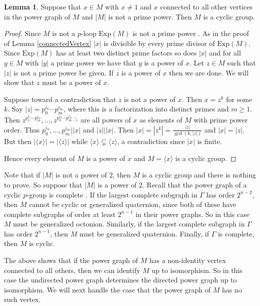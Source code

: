 \documentclass[12pt]{report}
\theoremstyle{definition}
\newtheorem{lem}[thm]{Lemma}
\newcommand{\Exp}{\text{Exp}}       %
\begin{document}
\begin{lem}
  Suppose that $x\in M$ with $x\neq 1$ and $x$ connected to all other vertices in the power
    graph of $M$ and $|M|$ is not a prime power. Then $M$ is a cyclic group.
\end{lem}

\begin{proof}
  Since $M$ is not a $p$-loop $\Exp(M)$ is not a prime power \cite{64and81}. As in the proof of
    Lemma \ref{connectedVertex} $|x|$ is divisible by every prime divisor of $\Exp(M)$. Since
    $\Exp(M)$ has at least two distinct prime factors so does $|x|$ and for all $y\in M$ with
    $|y|$ a prime power we have that $y$ is a power of $x$. Let $z\in M$ such that $|z|$ is not
    a prime power be given. If $z$ is a power of $x$ then we are done. We will show that $z$
    must be a power of $x$.

  Suppose toward a contradiction that $z$ is not a power of $x$. Then $x = z^k$ for some $k$.
    Say $|z| = p_0^{i_0}\cdots p_m^{i_m}$, where this is a factorization into distinct primes
    and $m\geq 1$. Then $z^{p_1^{i_1}\cdots p_m^{i_m}}, \ldots, z^{p_0^{i_0}\cdots p_{m - 1}^{i_{m - 1}}}$
    are all powers of $x$ as elements of $M$ with prime power order.
    Thus $p_0^{i_0}, \ldots, p_m^{i_m} | |x|$ and $|z| | |x|$. 
    Then $|x| = |z^k| = \frac{|z|}{\gcd(k, |z|)}$ and $|x| = |z|$. But then
    $|\langle x\rangle| = |\langle z\rangle|$ while $\langle x\rangle \subsetneq \langle z\rangle$,
    a contradiction since $|x|$ is finite.

  Hence every element of $M$ is a power of $x$ and $M = \langle x\rangle$ is a cyclic group.
\end{proof}

  Note that if $|M|$ is not a power of $2$, then $M$ is a cyclic group and there is nothing to prove.
    So suppose that $|M|$ is a power of $2$. Recall that the power graph of a cyclic $p$-group is
    complete \cite{Ivy}. If the largest complete subgraph in $\Gamma$ has order $2^{n - 2}$, then $M$
    cannot be cyclic or generalized quaternion, since both of these have complete subgraphs of order
    at least $2^{n - 1}$ in their power graphs. So in this case $M$ must be generalized octonion.
    Similarly, if the largest complete subgraph in $\Gamma$ has order $2^{n - 1}$, then $M$ must be
    generalized quaternion. Finally, if $\Gamma$ is complete, then $M$ is cyclic.

  The above shows that if the power graph of $M$ has a non-identity vertex connected to all others,
    then we can identify $M$ up to isomorphism. So in this case the undirected power graph determines
    the directed power graph up to isomorphism. We will next handle the case that the power graph of
    $M$ has no such vertex.
\end{document}
